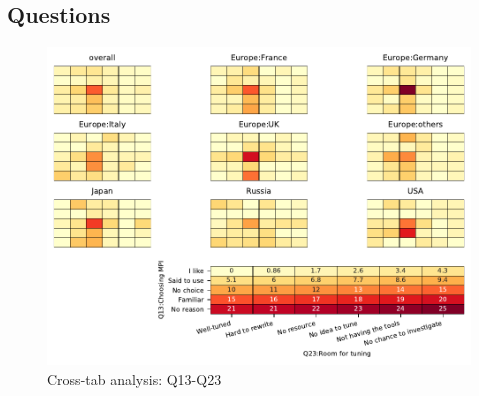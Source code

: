 
\subsection{Questions}


\begin{figure}
\begin{center}
\includegraphics[width=12cm]{../pdfs/Q13-Q23.pdf}
\caption{Cross-tab analysis: Q13-Q23}
\label{fig:Q13-Q23}
\end{center}
\end{figure}
